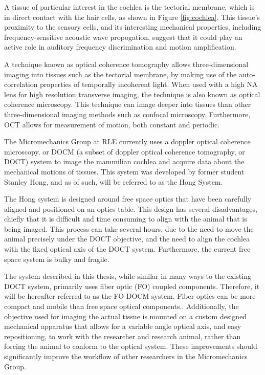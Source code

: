 A tissue of particular interest in the cochlea is the tectorial membrane, which is in direct contact with the hair cells, as shown in Figure \ref{fig:cochlea}. This tissue's proximity to the sensory cells, and its interesting mechanical properties, including frequency-sensitive acoustic wave propogation, suggest that it could play an active role in auditory frequency discrimination and motion amplification. \cite{Ghaffari2010}


A technique known as optical coherence tomography allows three-dimensional imaging into tissues such as the tectorial membrane, by making use of the auto-correlation properties of temporally incoherent light. When used with a high NA lens for high resolution transverse imaging, the technique is also known as optical coherence microscopy. This technique can image deeper into tissues than other three-dimensional imaging methods such as confocal microscopy. Furthermore, OCT allows for measurement of motion, both constant and periodic. \cite{DrexlerBook}

The Micromechanics Group at RLE currently uses a doppler optical coherence microscopy, or DOCM (a subset of doppler optical coherence tomography, or DOCT) system to image the mammilian cochlea and acquire data about the mechanical motions of tissues. This system was developed by former student Stanley Hong, and as of such, will be referred to as the Hong System. \cite{hong}

The Hong system is designed around free space optics that have been carefully aligned and positioned on an optics table. This design has several disadvantages, chiefly that it is difficult and time consuming to align with the animal that is being imaged. This process can take several hours, due to the need to move the animal precisely under the DOCT objective, and the need to align the cochlea with the fixed optical axis of the DOCT system. Furthermore, the current free space system is bulky and fragile.

The system described in this thesis, while similar in many ways to the existing DOCT system, primarily uses fiber optic (FO) coupled components. Therefore, it will be hereafter referred to as the FO-DOCM system. Fiber optics can be more compact and mobile than free space optical components.. Additionally, the objective used for imaging the actual tissue is mounted on a custom designed mechanical apparatus that allows for a variable angle optical axis, and easy repositioning, to work with the researcher and research animal, rather than forcing the animal to conform to the optical system. These improvements should significantly improve the workflow of other researchers in the Micromechanics Group.

